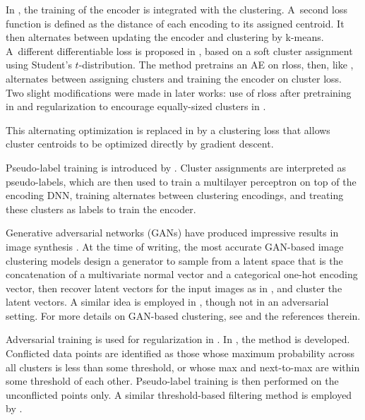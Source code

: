 \documentclass[runningheads]{llncs}
\begin{document}
In \cite{yang2017towards}, the training of the encoder is integrated with the clustering. A~second loss function is defined as the distance of each encoding to its assigned centroid. It then alternates between updating the encoder and clustering by k-means. A~different differentiable loss is proposed in \cite{xie2016unsupervised}, based on a soft cluster assignment using Student's $t$-distribution. The method pretrains an AE on rloss, then, like \cite{yang2017towards}, alternates between assigning clusters and training the encoder on cluster loss. Two slight modifications were made in later works: use of rloss after pretraining in \cite{guo2017improved} and regularization to encourage equally-sized clusters in \cite{Dizaji_2017_ICCV}.

This alternating optimization is replaced in \cite{gao2020deep} by a clustering loss that allows cluster centroids to be optimized directly by gradient descent. 

Pseudo-label training is introduced by \cite{caron2018deep}. Cluster assignments are interpreted as pseudo-labels, which are then used to train a multilayer perceptron on top of the encoding DNN, training alternates between clustering encodings, and treating these clusters as labels to train the encoder.




Generative adversarial networks \cite{goodfellow2014generative} (GANs) have produced impressive results in image synthesis \cite{Karras_2019_CVPR,elgammal2017can,brock2018large}. At the time of writing, the most accurate GAN-based image clustering models \cite{Mukherjee2019ClusterGANL,ding2019clustering}  design a generator to sample from a latent space that is the concatenation of a multivariate normal vector and a categorical one-hot encoding vector, then recover latent vectors for the input images as in \cite{creswell2018inverting,lipton2017precise}, and cluster the latent vectors. A similar idea is employed in \cite{jiang2016variational}, though not in an adversarial setting. For more details on GAN-based clustering, see \cite{Zhou_2018_CVPR,zhao2018gan,ding2019clustering,Liang_2018_ECCV,wang2019wegan} and the references therein.

Adversarial training is used for regularization in \cite{mrabah2019adversarial}. In \cite{mrabah2019deep}, the method is developed. Conflicted data points are identified as those whose maximum probability across all clusters is less than some threshold, or whose max and next-to-max are within some threshold of each other. Pseudo-label training is then performed on the unconflicted points only. A similar threshold-based filtering method is employed by \cite{chang2017deep}. 
\end{document}
